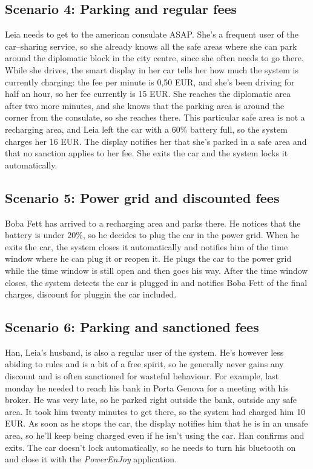 \subsection{Scenario 4: Parking and regular fees}
	Leia needs to get to the american consulate ASAP. She's a frequent user of the car–sharing service, so she already knows all the safe areas where she can park around the diplomatic block in the city centre, since she often needs to go there. While she drives, the smart display in her car tells her how much the system is currently charging: the fee per minute is 0,50 EUR, and she's been driving for half an hour, so her fee currently is 15 EUR. She reaches the diplomatic area after two more minutes, and she knows that the parking area is around the corner from the consulate, so she reaches there. This particular safe area is not a recharging area, and Leia left the car with a 60\% battery full, so the system charges her 16 EUR. The display notifies her that she's parked in a safe area and that no sanction applies to her fee. She exits the car and the system locks it automatically. 
	
\subsection{Scenario 5: Power grid and discounted fees}
	Boba Fett has arrived to a recharging area and parks there. He notices that the battery is under 20\%, so he decides to plug the car in the power grid. When he exits the car, the system closes it automatically and notifies him of the time window where he can plug it or reopen it. He plugs the car to the power grid while the time window is still open and then goes his way. After the time window closes, the system detects the car is plugged in and notifies Boba Fett of the final charges, discount for pluggin the car included. 
	
\subsection{Scenario 6: Parking and sanctioned fees}
	Han, Leia's husband, is also a regular user of the system. He's however less abiding to rules and is a bit of a free spirit, so he generally never gains any discount and is often sanctioned for wasteful behaviour. For example, last monday he needed to reach his bank in Porta Genova for a meeting with his broker. He was very late, so he parked right outside the bank, outside any safe area. It took him twenty minutes to get there, so the system had charged him 10 EUR. As soon as he stops the car, the display notifies him that he is in an unsafe area, so he'll keep being charged even if he isn't using the car. Han confirms and exits. The car doesn't lock automatically, so he needs to turn his bluetooth on and close it with the \textit{PowerEnJoy} application. 

